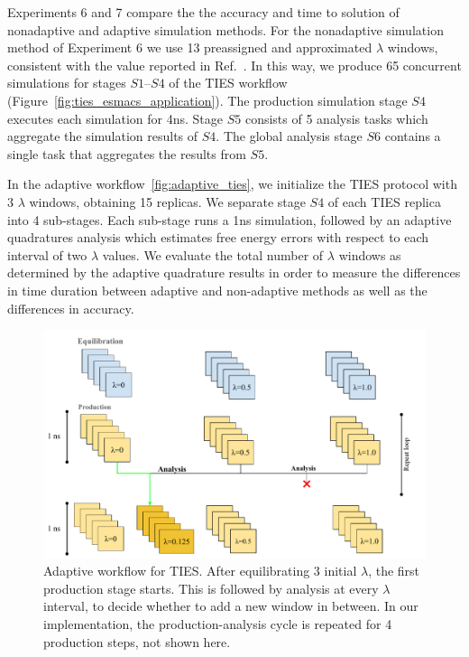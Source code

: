 Experiments 6 and 7 compare the the accuracy and time to solution of
nonadaptive and adaptive simulation methods. For the nonadaptive simulation
method of Experiment 6 we use 13 preassigned and approximated $\lambda$
windows, consistent with the value reported in Ref.~\cite{Bhati2017}. In this
way, we produce 65 concurrent simulations for stages $S1$--$S4$ of the TIES
workflow (Figure~\ref{fig:ties_esmacs_application}). The production
simulation stage $S4$ executes each simulation for 4ns. Stage $S5$ consists
of 5 analysis tasks which aggregate the simulation results of $S4$. The
global analysis stage $S6$ contains a single task that aggregates the results
from $S5$.

In the adaptive workflow~\ref{fig:adaptive_ties}, we initialize the TIES
protocol with 3 $\lambda$ windows, obtaining 15 replicas. We separate stage
$S4$ of each TIES replica into 4 sub-stages. Each sub-stage runs a 1ns
simulation, followed by an adaptive quadratures analysis which estimates free
energy errors with respect to each interval of two $\lambda$ values. We
evaluate the total number of $\lambda$ windows as determined by the adaptive
quadrature results in order to measure the differences in time duration
between adaptive and non-adaptive methods as well as the differences in
accuracy.

\begin{figure}
  \centering
  \includegraphics[width=\columnwidth]{figures/Adaptive_TIES.pdf}
  \caption{Adaptive workflow for TIES. After equilibrating 3 initial
  $\lambda$, the first production stage starts. This is followed by analysis
  at every $\lambda$ interval, to decide whether to add a new window in
  between. In our implementation, the production-analysis cycle is repeated
  for 4 production steps, not shown here.}
\label{fig:adaptive_TIES}
\end{figure}

